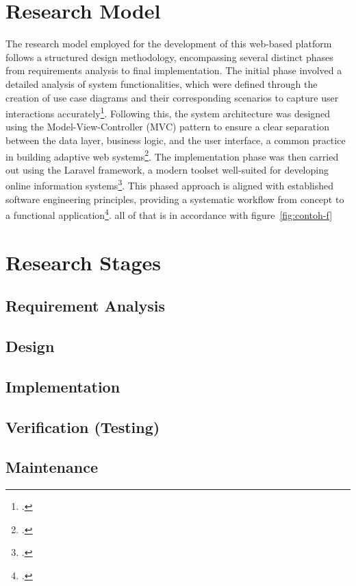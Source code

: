 	\section{Research Model}
	The research model employed for the development of this web-based platform follows a structured design methodology, encompassing several distinct phases from requirements analysis to final implementation. The initial phase involved a detailed analysis of system functionalities, which were defined through the creation of use case diagrams and their corresponding scenarios to capture user interactions accurately\footcite{taufan2022}. Following this, the system architecture was designed using the Model-View-Controller (MVC) pattern to ensure a clear separation between the data layer, business logic, and the user interface, a common practice in building adaptive web systems\footcite{hidayat2012}. The implementation phase was then carried out using the Laravel framework, a modern toolset well-suited for developing online information systems\footcite{prawito2020}. This phased approach is aligned with established software engineering principles, providing a systematic workflow from concept to a functional application\footcite{sommerville2016}.
	all of that is in accordance with figure~\ref{fig:contoh-f}
	\contohfigur
	
	\section{Research Stages}
	\setlength{\leftskip}{1.4cm}
		\subsection{Requirement Analysis}
		\lipsum[1]
		
		\subsection{Design}
		\lipsum[1]
		
		\subsection{Implementation}
		\lipsum[1]
		
		\subsection{Verification (Testing)}
		\lipsum[1]
		
		\subsection{Maintenance}
		\lipsum[1]
			